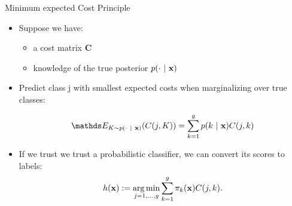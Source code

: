 \documentclass[11pt,compress,t,notes=noshow, aspectratio=169, xcolor=table]{beamer}
\begin{document}
\begin{frame}{Minimum expected Cost Principle}


		\begin{itemize}
		
			\item Suppose we have:
            \begin{itemize}
                \item a cost matrix $\mathbf{C}$
                
                \item knowledge of the true posterior $p(\cdot ~|~ \mathbf{x})$
            \end{itemize}

                

			\item Predict class j with smallest expected costs when marginalizing over true classes:
	
			$$ 	\E_{K \sim p(\cdot ~|~ \xv)}( C(j,K) ) = \sumkg p(k ~|~ \xv) C(j,k)	$$
	
		\end{itemize}

    \begin{itemize}
        \item If we trust we trust a probabilistic classifier, we can convert its scores to labels:
		$$  h(\mathbf{x}) := \mathop{\mathrm{arg\,min}}\limits_{j=1,\ldots,g} \sum\limits_{k=1}^g 	\pi_{k}(\mathbf{x}) C(j,k). $$
 
        

\end{itemize}
\end{frame}
\end{document}
